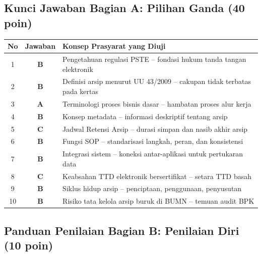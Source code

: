 \documentclass[12pt,a4paper]{report}
\begin{document}
\subsection{Kunci Jawaban Bagian A: Pilihan Ganda (40 poin)}

\renewcommand{\arraystretch}{1.4}
\begin{center}
\begin{tabularx}{0.95\textwidth}{@{} c c X @{}}
\toprule
\textbf{No} & \textbf{Jawaban} & \textbf{Konsep Prasyarat yang Diuji} \\
\midrule
1 & \textbf{B} & Pengetahuan regulasi PSTE -- fondasi hukum tanda tangan elektronik \\
2 & \textbf{B} & Definisi arsip menurut UU 43/2009 -- cakupan tidak terbatas pada kertas \\
3 & \textbf{A} & Terminologi proses bisnis dasar -- hambatan proses alur kerja \\
4 & \textbf{B} & Konsep metadata -- informasi deskriptif tentang arsip \\
5 & \textbf{C} & Jadwal Retensi Arsip -- durasi simpan dan nasib akhir arsip \\
6 & \textbf{B} & Fungsi SOP -- standarisasi langkah, peran, dan konsistensi \\
7 & \textbf{B} & Integrasi sistem -- koneksi antar-aplikasi untuk pertukaran data \\
8 & \textbf{C} & Keabsahan TTD elektronik bersertifikat -- setara TTD basah \\
9 & \textbf{B} & Siklus hidup arsip -- penciptaan, penggunaan, penyusutan \\
10 & \textbf{B} & Risiko tata kelola arsip buruk di BUMN -- temuan audit BPK \\
\bottomrule
\end{tabularx}
\end{center}
\renewcommand{\arraystretch}{1.0}

\vspace{0.5cm}

\subsection{Panduan Penilaian Bagian B: Penilaian Diri (10 poin)}
\end{document}
